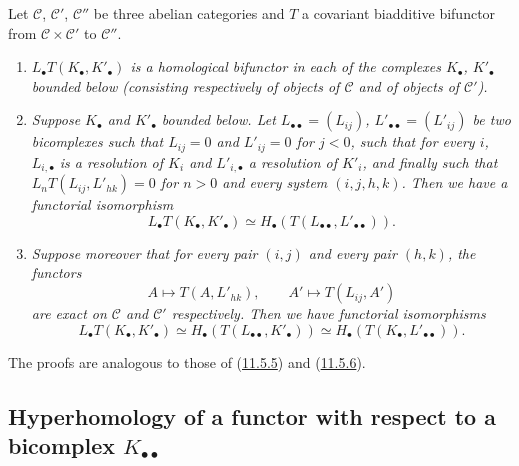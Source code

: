 \begin{proposition}[11.6.5]
\label{0.11.6.5}
Let $\mathcal C$, $\mathcal C'$, $\mathcal C''$ be three abelian
categories and $T$ a covariant biadditive bifunctor from
$\mathcal C\times\mathcal C'$ to $\mathcal C''$.
\begin{enumerate}
\item[{\rm(i)}] \emph{$L_\bullet T(K_\bullet,K'_\bullet)$ is a homological
bifunctor in each of the complexes $K_\bullet$, $K'_\bullet$ bounded below
(consisting respectively of objects of $\mathcal C$ and of objects of
$\mathcal C'$).}
\item[{\rm(ii)}] \emph{Suppose $K_\bullet$ and $K'_\bullet$ bounded
below. Let $L_{\bullet\bullet}=(L_{ij})$,
$L'_{\bullet\bullet}=(L'_{ij})$ be two bicomplexes such that $L_{ij}=0$ and
$L'_{ij}=0$ for $j<0$, such that for every $i$, $L_{i,\bullet}$ is a
resolution of $K_i$ and $L'_{i,\bullet}$ a resolution of $K'_i$, and finally such that
$L_nT(L_{ij},L'_{hk})=0$ for $n>0$ and every system $(i,j,h,k)$. Then we have
a functorial isomorphism}
\[
\label{0.11.6.5.1}
\tag{11.6.5.1}
L_\bullet T(K_\bullet,K'_\bullet)
\simeq H_\bullet(T(L_{\bullet\bullet},L'_{\bullet\bullet})).
\]
\item[{\rm(iii)}] \emph{Suppose moreover that for every pair $(i,j)$ and
every pair $(h,k)$, the functors
\[
A\longmapsto T(A,L'_{hk}),\qquad
A'\longmapsto T(L_{ij},A')
\]
are exact on $\mathcal C$ and $\mathcal C'$ respectively. Then we have
functorial isomorphisms}
\[
\label{0.11.6.5.2}
\tag{11.6.5.2}
L_\bullet T(K_\bullet,K'_\bullet)
\simeq H_\bullet(T(L_{\bullet\bullet},K'_\bullet))
\simeq H_\bullet(T(K_\bullet,L'_{\bullet\bullet})).
\]
\end{enumerate}
The proofs are analogous to those of
(\hyperref[0.11.5.5]{11.5.5}) and (\hyperref[0.11.5.6]{11.5.6}).
\end{proposition}


\subsection{Hyperhomology of a functor with respect to a bicomplex
$K_{\bullet\bullet}$}
\label{subsection:0.11.7}


